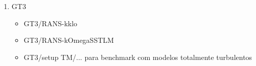 \documentclass[12pt,a4paper]{article}
\begin{document}
\begin{enumerate}
\begin{itemize}
            \end{itemize}

            \begin{enumerate}
                
                \item Construir grafico $u^+$ vs. $y^+$ para ao menos 2 modelos.

                \item Calcular coeficiente de atrito local e comparar tendência com correlações/clássico da placa plana.
                
                    \begin{equation}
                        C_f = \frac{\tau_w}{\tfrac{1}{2} \rho U_\infty^2}
                        \label{eq:placeholder_label}
                    \end{equation}

                \item Comparar resposta high-Re (wall functions) vs. low-Re (wall-resolved)

                \item  Comparar explicitamente os casos GT2/SRS/DES KO LRN e GT2/SRS/LES-WALE LRN com base em mu+-y+, Cf (x), y+, custo computacional e estabilidade numérica

                \item Comentar criticamente as limitações de usar DES e LES em 2D ( conforme notas dos próprios casos) e o impacto disso na interpretação dos resultados.

                \item Relacionar qualidade de resultados com faixa de y+ observada.

            \end{enumerate}

        \item GT3

            \begin{itemize}
                
                \item GT3/RANS-kklo

                \item GT3/RANS-kOmegaSSTLM

                \item GT3/setup TM/... para benchmark com modelos totalmente turbulentos
                
            \end{itemize}


\end{enumerate}
\end{document}
